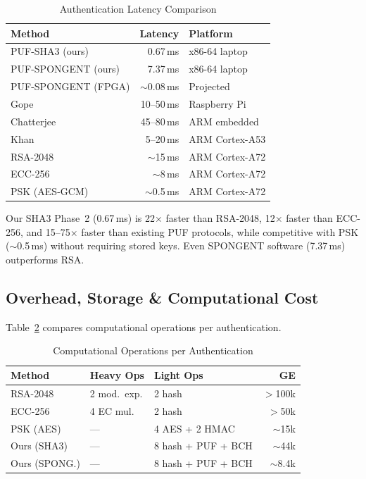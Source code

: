\documentclass[conference]{IEEEtran}
\begin{document}
\begin{table}[H]
\centering
\caption{Authentication Latency Comparison}
\label{tab:latency_cmp}
\footnotesize
\begin{tabular}{@{}lrl@{}}
\toprule
\textbf{Method} & \textbf{Latency} & \textbf{Platform} \\
\midrule
PUF-SHA3 (ours) & 0.67\,ms & x86-64 laptop \\
PUF-SPONGENT (ours) & 7.37\,ms & x86-64 laptop \\
PUF-SPONGENT (FPGA) & $\sim$0.08\,ms & Projected \\
Gope~\cite{puf_lightweight_uav} & 10--50\,ms & Raspberry Pi \\
Chatterjee~\cite{puf_uav_cross_domain} & 45--80\,ms & ARM embedded \\
Khan~\cite{puf_6g_uav} & 5--20\,ms & ARM Cortex-A53 \\
RSA-2048 & $\sim$15\,ms & ARM Cortex-A72 \\
ECC-256 & $\sim$8\,ms & ARM Cortex-A72 \\
PSK (AES-GCM) & $\sim$0.5\,ms & ARM Cortex-A72 \\
\bottomrule
\end{tabular}
\end{table}

Our SHA3 Phase~2 (0.67\,ms) is 22$\times$ faster than RSA-2048, 12$\times$ faster than ECC-256, and 15--75$\times$ faster than existing PUF protocols, while competitive with PSK ($\sim$0.5\,ms) without requiring stored keys. Even SPONGENT software (7.37\,ms) outperforms RSA.

\subsection{Overhead, Storage \& Computational Cost}

Table~\ref{tab:compute} compares computational operations per authentication.

\begin{table}[H]
\centering
\caption{Computational Operations per Authentication}
\label{tab:compute}
\footnotesize
\begin{tabular}{@{}lp{1.6cm}p{2cm}r@{}}
\toprule
\textbf{Method} & \textbf{Heavy Ops} & \textbf{Light Ops} & \textbf{GE} \\
\midrule
RSA-2048 & 2 mod.\ exp. & 2 hash & $>$100k \\
ECC-256 & 4 EC mul. & 2 hash & $>$50k \\
PSK (AES) & --- & 4 AES + 2 HMAC & $\sim$15k \\
Ours (SHA3) & --- & 8 hash + PUF + BCH & $\sim$44k \\
Ours (SPONG.) & --- & 8 hash + PUF + BCH & $\sim$8.4k \\
\bottomrule
\end{tabular}
\end{table}
\end{document}
